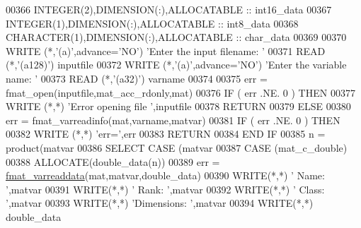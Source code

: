 \begin{DoxyCode}
{00366         \textcolor{keywordtype}{INTEGER(2)},\textcolor{keywordtype}{DIMENSION(:)},\textcolor{keywordtype}{ALLOCATABLE}   :: int16\_data
00367         \textcolor{keywordtype}{INTEGER(1)},\textcolor{keywordtype}{DIMENSION(:)},\textcolor{keywordtype}{ALLOCATABLE}   :: int8\_data
00368         \textcolor{keywordtype}{CHARACTER(1)},\textcolor{keywordtype}{DIMENSION(:)},\textcolor{keywordtype}{ALLOCATABLE} :: char\_data
00369 
00370         \textcolor{keyword}{WRITE} (*,\textcolor{stringliteral}{'(a)'},advance=\textcolor{stringliteral}{'NO'}) \textcolor{stringliteral}{'Enter the input filename: '}
00371         \textcolor{keyword}{READ} (*,\textcolor{stringliteral}{'(a128)'}) inputfile
00372         \textcolor{keyword}{WRITE} (*,\textcolor{stringliteral}{'(a)'},advance=\textcolor{stringliteral}{'NO'}) \textcolor{stringliteral}{'Enter the variable name: '}
00373         \textcolor{keyword}{READ} (*,\textcolor{stringliteral}{'(a32)'}) varname
00374 
00375         err = fmat\_open(inputfile,mat\_acc\_rdonly,mat)
00376         \textcolor{keywordflow}{IF} ( err .NE. 0 ) \textcolor{keywordflow}{THEN}
00377             \textcolor{keyword}{WRITE} (*,*) \textcolor{stringliteral}{'Error opening file '},inputfile
00378             \textcolor{keywordflow}{RETURN}
00379         \textcolor{keywordflow}{ELSE}
00380             err = fmat\_varreadinfo(mat,varname,matvar)
00381             \textcolor{keywordflow}{IF} ( err .NE. 0 ) \textcolor{keywordflow}{THEN}
00382                 \textcolor{keyword}{WRITE} (*,*) \textcolor{stringliteral}{'err='},err
00383                 \textcolor{keywordflow}{RETURN}
00384 \textcolor{keywordflow}{            END IF}
00385             n = product(matvar%
00386             \textcolor{keywordflow}{SELECT CASE} (matvar%
00387                 \textcolor{keywordflow}{CASE} (mat\_c\_double)
00388                     \textcolor{keyword}{ALLOCATE}(double\_data(n))
00389                     err = \hyperlink{interfacematio_1_1fmat__varreaddata}{fmat\_varreaddata}(mat,matvar,double\_data)
00390                     \textcolor{keyword}{WRITE}(*,*) \textcolor{stringliteral}{'      Name: '},matvar%
00391                     \textcolor{keyword}{WRITE}(*,*) \textcolor{stringliteral}{'      Rank: '},matvar%
00392                     \textcolor{keyword}{WRITE}(*,*) \textcolor{stringliteral}{'     Class: '},matvar%
00393                     \textcolor{keyword}{WRITE}(*,*) \textcolor{stringliteral}{'Dimensions: '},matvar%
00394                     \textcolor{keyword}{WRITE}(*,*) double\_data
}
\end{DoxyCode}
